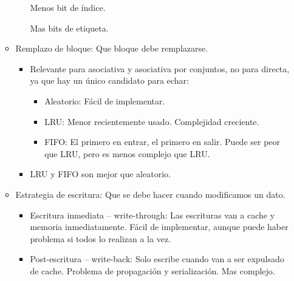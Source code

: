 \documentclass[12pt, twoside, openright]{report} %
\begin{document}
\begin{itemize}
\begin{itemize}
\begin{itemize}
          Menos bit de índice.

          Mas bits de etiqueta.

        \end{itemize}
      \item
        Remplazo de bloque: Que bloque debe remplazarse.

        \begin{itemize}
        
        \item
          Relevante para asociativa y asociativa por conjuntos, no para
          directa, ya que hay un único candidato para echar:

          \begin{itemize}
          
          \item
            Aleatorio: Fácil de implementar.
          \item
            LRU: Menor recientemente usado. Complejidad creciente.
          \item
            FIFO: El primero en entrar, el primero en salir. Puede ser
            peor que LRU, pero es menos complejo que LRU.
          \end{itemize}
        \item
          LRU y FIFO son mejor que aleatorio.
        \end{itemize}
        \pagebreak
      \item
        Estrategia de escritura: Que se debe hacer cuando modificamos un
        dato.

        \begin{itemize}
        \item
          Escritura inmediata -- write-through: Las escrituras van a
          cache y memoria inmediatamente. Fácil de implementar, aunque
          puede haber problema si todos lo realizan a la vez.
        \item
          Post-escritura -- write-back: Solo escribe cuando van a ser
          expulsado de cache. Problema de propagación y serialización.
          Mas complejo.


\end{itemize}
\end{itemize}
\end{itemize}
\end{document}
